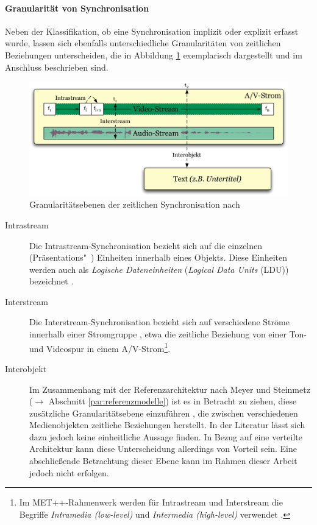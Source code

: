 
\paragraph{Granularität von Synchronisation} %
\label{par:granularitaet_von_synchronisation}

  Neben der Klassifikation, ob eine Synchronisation implizit oder explizit erfasst wurde, lassen sich ebenfalls unterschiedliche Granularitäten von zeitlichen Beziehungen unterscheiden, die in Abbildung \ref{fig:granularitaetsebenen} exemplarisch dargestellt und im Anschluss beschrieben sind.
  
  \begin{figure}[!ht]
    \centering
      \includegraphics[width=.9\textwidth]{images/Granularitaetsebenen.pdf}
    \caption{Granularitätsebenen der zeitlichen Synchronisation nach \citep{antons09}}
    \label{fig:granularitaetsebenen}
  \end{figure}
  
  \begin{description}
    \item[Intrastream] Die Intrastream-Synchronisation bezieht sich auf die einzelnen (Präsen\-tations"~) Einheiten innerhalb eines Objekts. Diese Einheiten werden auch als \emph{Logische Dateneinheiten} (\emph{Logical Data Units} (LDU)) bezeichnet \citep{steinmetz1990spm}.
    \item[Interstream] Die Interstream-Synchronisation bezieht sich auf verschiedene Ströme innerhalb einer Stromgruppe \citep{multimedia_technologie}, etwa die zeitliche Beziehung von einer Ton- und Videospur in einem A/V-Strom\footnote{Im MET++-Rahmenwerk werden für Intrastream und Interstream die Begriffe \emph{Intramedia (low-level)} und \emph{Intermedia (high-level)} verwendet \citep[S. 73]{ackermann1996doo}.}.
    \item[Interobjekt] Im Zusammenhang mit der Referenzarchitektur nach Meyer und Steinmetz ($\to$ Abschnitt \ref{par:referenzmodelle}) ist es in Betracht zu ziehen, diese zusätzliche Granularitätsebene einzuführen \citep[S. 264]{wu2001svo}, die zwischen verschiedenen Medienobjekten zeitliche Beziehungen herstellt. In der Literatur lässt sich dazu jedoch keine einheitliche Aussage finden. In Bezug auf eine verteilte Architektur kann diese Unterscheidung allerdings von Vorteil sein. Eine abschließende Betrachtung dieser Ebene kann im Rahmen dieser Arbeit jedoch nicht erfolgen.
  \end{description}
  
